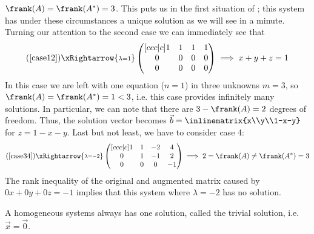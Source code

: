 \begin{exm}
\begin{flushleft}
		$\frank(A)=\frank(A^*)=3$. This puts us in the first situation of
		; this system has under these circumstances a unique
		solution as we will see in a minute. Turning our attention to the second
		case we can immediately see that
		\begin{equation*}
			(\ref{case12})\xRightarrow{\substack{\lambda=1}}
			\begin{pmatrix}[ccc|c]
				1 & 1 & 1 & 1 \\
				0 & 0 & 0 & 0 \\
				0 & 0 & 0 & 0
			\end{pmatrix}\implies x+y+z=1
		\end{equation*}
		In this case we are left with one equation ($n=1$) in three unknowns
		$m=3$, so $\frank(A)=\frank(A^*)=1<3$, i.e. this case provides infinitely
		many solutions. In particular, we can note that there are $3-\frank(A)=2$
		degrees of freedom. Thus, the solution vector becomes
		$\vec{b}=\inlinematrix{x\\y\\1-x-y}$
		for $z=1-x-y$. Last but not least, we have to consider case 4:
		\begin{equation*}
			(\ref{case34})\xRightarrow{\substack{\lambda=-2}}
			\begin{pmatrix}[ccc|c]
				1 & 1 & -2 & 4  \\
				0 & 1 & -1 & 2  \\
				0 & 0 & 0  & -1
			\end{pmatrix}\implies 2=\frank(A)\neq\frank(A^*)=3
		\end{equation*}
		The rank inequality of the original and augmented matrix caused by
		$0x+0y+0z=-1$ implies that this system where $\lambda=-2$ has no solution.
	\end{flushleft}
\end{exm}

\begin{thm}\label{thm-trivial-solution}
	A homogeneous systems always has one solution, called the trivial solution,
	i.e. $\vec{x}=\vec{0}$.
\end{thm}

